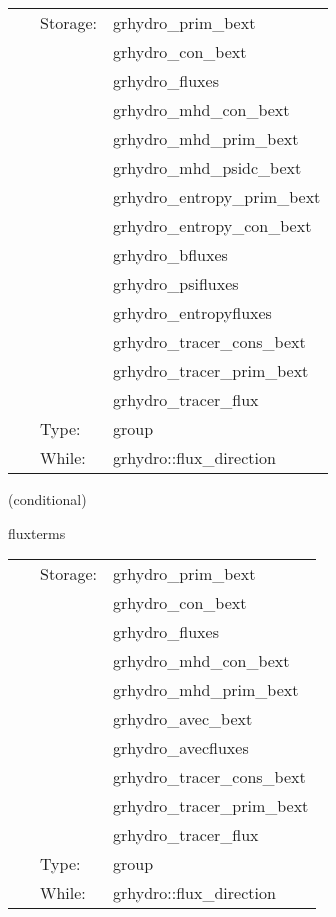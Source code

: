  \begin{tabular*}{160mm}{cll} 
~ & Storage:  & grhydro\_prim\_bext \\ 
~& ~ &grhydro\_con\_bext\\ 
~& ~ &grhydro\_fluxes\\ 
~& ~ &grhydro\_mhd\_con\_bext\\ 
~& ~ &grhydro\_mhd\_prim\_bext\\ 
~& ~ &grhydro\_mhd\_psidc\_bext\\ 
~& ~ &grhydro\_entropy\_prim\_bext\\ 
~& ~ &grhydro\_entropy\_con\_bext\\ 
~& ~ &grhydro\_bfluxes\\ 
~& ~ &grhydro\_psifluxes\\ 
~& ~ &grhydro\_entropyfluxes\\ 
~& ~ &grhydro\_tracer\_cons\_bext\\ 
~& ~ &grhydro\_tracer\_prim\_bext\\ 
~& ~ &grhydro\_tracer\_flux\\ 
~ & Type:  & group \\ 
~ & While:  & grhydro::flux\_direction \\ 
\end{tabular*} 


\vspace{5mm}

   (conditional) 

\hspace{5mm} fluxterms 

\hspace{5mm}{\it calculation of intercell fluxes } 


\hspace{5mm}

 \begin{tabular*}{160mm}{cll} 
~ & Storage:  & grhydro\_prim\_bext \\ 
~& ~ &grhydro\_con\_bext\\ 
~& ~ &grhydro\_fluxes\\ 
~& ~ &grhydro\_mhd\_con\_bext\\ 
~& ~ &grhydro\_mhd\_prim\_bext\\ 
~& ~ &grhydro\_avec\_bext\\ 
~& ~ &grhydro\_avecfluxes\\ 
~& ~ &grhydro\_tracer\_cons\_bext\\ 
~& ~ &grhydro\_tracer\_prim\_bext\\ 
~& ~ &grhydro\_tracer\_flux\\ 
~ & Type:  & group \\ 
~ & While:  & grhydro::flux\_direction \\ 
\end{tabular*} 


